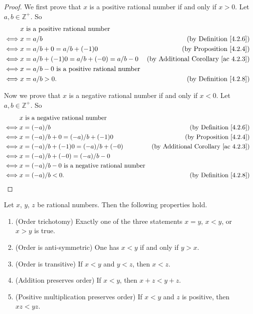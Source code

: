 \begin{proof}
We first prove that \(x\) is a positive rational number if and only if \(x > 0\).
Let \(a, b \in \mathds{Z}^+\).
So
\begin{align*}
& x \text{ is a positive rational number} \\
\iff & x = a / b & \text{(by Definition \ref{4.2.6})} \\
\iff & x = a / b + 0 = a / b + (-1)0 & \text{(by Proposition \ref{4.2.4})} \\
\iff & x = a / b + (-1)0 = a / b + (-0) = a / b - 0 & \text{(by Additional Corollary \ref{ac 4.2.3})} \\
\iff & x = a / b - 0 \text{ is a positive rational number} \\
\iff & x = a / b > 0. & \text{(by Definition \ref{4.2.8})}
\end{align*}

Now we prove that \(x\) is a negative rational number if and only if \(x < 0\).
Let \(a, b \in \mathds{Z}^+\).
So
\begin{align*}
& x \text{ is a negative rational number} \\
\iff & x = (-a) / b & \text{(by Definition \ref{4.2.6})} \\
\iff & x = (-a) / b + 0 = (-a) / b + (-1)0 & \text{(by Proposition \ref{4.2.4})} \\
\iff & x = (-a) / b + (-1)0 = (-a) / b + (-0) & \text{(by Additional Corollary \ref{ac 4.2.3})} \\
\iff & x = (-a) / b + (-0) = (-a) / b - 0 \\
\iff & x = (-a) / b - 0 \text{ is a negative rational number} \\
\iff & x = (-a) / b < 0. & \text{(by Definition \ref{4.2.8})}
\end{align*}
\end{proof}

\begin{proposition}\label{4.2.9}
Let \(x\), \(y\), \(z\) be rational numbers.
Then the following properties hold.
\begin{enumerate}
    \item (Order trichotomy)
    Exactly one of the three statements \(x = y\), \(x < y\), or \(x > y\) is true.
    \item (Order is anti-symmetric)
    One has \(x < y\) if and only if \(y > x\).
    \item (Order is transitive)
    If \(x < y\) and \(y < z\), then \(x < z\).
    \item (Addition preserves order)
    If \(x < y\), then \(x + z < y + z\).
    \item (Positive multiplication preserves order)
    If \(x < y\) and \(z\) is positive, then \(xz < yz\).
\end{enumerate}
\end{proposition}

